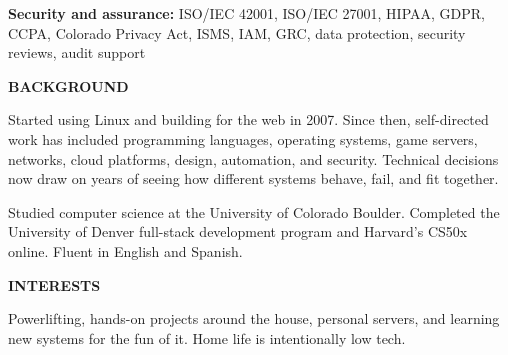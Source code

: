 \documentclass[10pt,letterpaper]{article}
\newcommand{\resumeSection}[1]{%
  \vspace{6pt}%
  {\color{navy}\bfseries\fontsize{11.5}{13}\selectfont\MakeUppercase{#1}}\par
  \vspace{1pt}{\color{navy}\rule{\textwidth}{0.7pt}}\vspace{1.5pt}
}
\begin{document}
\textbf{Security and assurance:} ISO/IEC 42001, ISO/IEC 27001, HIPAA, GDPR, CCPA, Colorado Privacy Act, ISMS, IAM, GRC, data protection, security reviews, audit support

\resumeSection{Background}
Started using Linux and building for the web in 2007. Since then, self-directed work has included programming languages, operating systems, game servers, networks, cloud platforms, design, automation, and security. Technical decisions now draw on years of seeing how different systems behave, fail, and fit together.

Studied computer science at the University of Colorado Boulder. Completed the University of Denver full-stack development program and Harvard's CS50x online. Fluent in English and Spanish.

\resumeSection{Interests}
Powerlifting, hands-on projects around the house, personal servers, and learning new systems for the fun of it. Home life is intentionally low tech.
\end{document}
